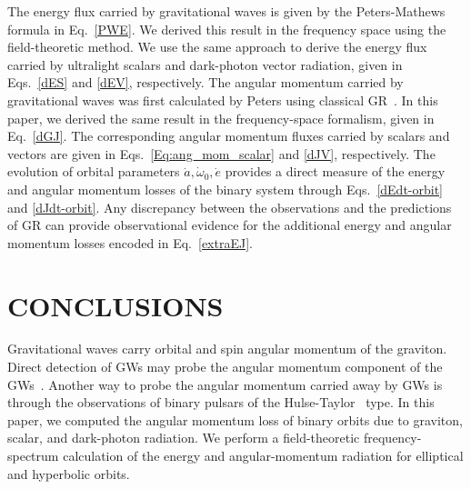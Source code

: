 \documentclass[aps,prd]{revtex4-2}
\begin{document}
The energy flux carried by gravitational waves is given by the Peters-Mathews formula in Eq.~\eqref{PWE}. We derived this result in the frequency space using the field-theoretic method. We use the same approach to derive the energy flux carried by ultralight scalars and dark-photon vector radiation, given in Eqs.~\eqref{dES} and \eqref{dEV}, respectively. The angular momentum carried by gravitational waves was first calculated by Peters using classical GR~\cite{Peters:1964zz}. In this paper, we derived the same result in the frequency-space formalism, given in Eq.~\eqref{dGJ}. The corresponding angular momentum fluxes carried by scalars and vectors are given in Eqs.~\eqref{Eq:ang_mom_scalar} and \eqref{dJV}, respectively. The evolution of orbital parameters $\dot{a}, \dot {\omega}_{0}, \dot {e}$ provides a direct measure of the energy and angular momentum losses of the binary system through Eqs.~\eqref{dEdt-orbit} and \eqref{dJdt-orbit}. Any discrepancy between the observations and the predictions of GR can provide observational evidence for the additional energy and angular momentum losses encoded in Eq.~\eqref{extraEJ}.


\section{CONCLUSIONS}\label{Sec:conclusions}

Gravitational waves carry orbital and spin angular momentum of the graviton. Direct detection of GWs may probe the angular momentum component of the GWs~\cite{Baral:2019dke}. Another way to probe the angular momentum carried away by GWs is through the observations of binary pulsars of the Hulse-Taylor~\cite{Hulse:1974eb} type. In this paper, we computed the angular momentum loss of binary orbits due to graviton, scalar, and dark-photon radiation. We perform a field-theoretic frequency-spectrum calculation of the energy and angular-momentum radiation for elliptical and hyperbolic orbits. 
\end{document}
